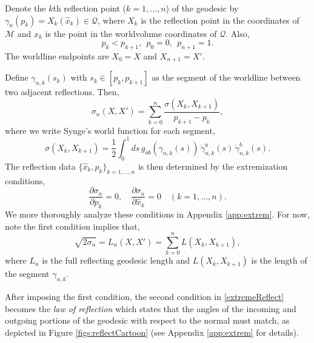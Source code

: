 \documentclass[reprint,amsmath,amssymb,aps,nofootinbib,twocolumn]{revtex4-2}
\begin{document}
Denote the $k$th reflection point ($k = 1,...,n$) of the geodesic by $\gamma_n(p_k) = X_k(\hat{x}_k) \in \mathcal{Q}$, where $ X_k $ is the reflection point in the coordinates of $ \mathcal{M} $ and $\hat{x}_k$ is the point in the worldvolume coordinates of $\mathcal{Q}$. Also,
\begin{equation}
p_k < p_{k+1},\ \ p_0 = 0,\ \ p_{n+1} = 1.
\end{equation}
The worldline endpoints are $X_0 = X$ and $X_{n+1} = X'$.

Define $\gamma_{n,k}(s_k)$ with $s_k \in [p_k,p_{k+1}]$ as the segment of the worldline between two adjacent reflections. Then,
\begin{equation}
\sigma_n(X,X') = \sum_{k=0}^n \frac{\sigma(X_k,X_{k+1})}{p_{k+1} - p_k},\label{nRefAct}
\end{equation}
where we write Synge's world function for each segment,
\begin{equation}
\sigma(X_k,X_{k+1}) = \frac{1}{2}\int_{0}^{1} ds\,g_{ab}(\gamma_{n,k}(s))\,\dot{\gamma}_{n,k}^{a}(s)\,\dot{\gamma}_{n,k}^{b}(s).
\end{equation}
The reflection data $\{\hat{x}_k,p_k\}_{k=1,...,n}$ is then determined by the extremization conditions,
\begin{equation}
\frac{\partial \sigma_n}{\partial p_k} = 0, \quad \frac{\partial\sigma_n}{\partial\hat{x}_k} = 0 \quad (k=1,...,n).
\label{extremeReflect}
\end{equation}
We more thoroughly analyze these conditions in Appendix \ref{app:extrem}. For now, note the first condition implies that,
\begin{equation}
\sqrt{2\sigma_n} = L_n(X,X') = \sum_{k=0}^{n} L(X_{k},X_{k+1}),
\label{sqrtsigma}
\end{equation}
where $ L_n $ is the full reflecting geodesic length and $ L(X_{k},X_{k+1}) $ is the length of the segment $\gamma_{n,k} $.

After imposing the first condition, the second condition in \eqref{extremeReflect} becomes the \textit{law of reflection} which states that the angles of the incoming and outgoing portions of the geodesic with respect to the normal must match, as depicted in Figure \ref{figs:reflectCartoon} (see Appendix \ref{app:extrem} for details).
\end{document}
